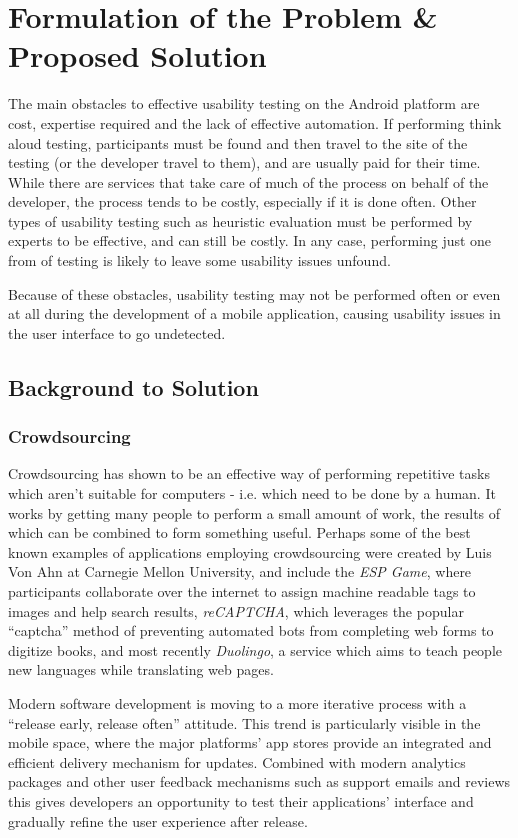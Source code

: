 \chapter{Formulation of the Problem \& Proposed Solution}

The main obstacles to effective usability testing on the Android platform are
cost, expertise required and the lack of effective automation.  If performing
think aloud testing, participants must be found and then travel to the site of
the testing (or the developer travel to them), and are usually paid for their
time. While there are services that take care of much of the process on behalf
of the developer, the process tends to be costly, especially if it is done
often.  Other types of usability testing such as heuristic evaluation must be
performed by experts to be effective, and can still be costly.  In any case,
performing just one from of testing is likely to leave some usability issues
unfound.

Because of these obstacles, usability testing may not be performed often or
even at all during the development of a mobile application, causing usability
issues in the user interface to go undetected.

\section{Background to Solution}

\subsection{Crowdsourcing}

Crowdsourcing has shown to be an effective way of performing repetitive tasks
which aren't suitable for computers - i.e. which need to be done by a human. It
works by getting many people to perform a small amount of work, the results of
which can be combined to form something useful. Perhaps some of the best known
examples of applications employing crowdsourcing were created by Luis Von Ahn
at Carnegie Mellon University, and include the \emph{ESP Game}, where
participants collaborate over the internet to assign machine readable tags to
images and help search results, \emph{reCAPTCHA}, which leverages the popular
``captcha'' method of preventing automated bots from completing web forms to
digitize books, and most recently \emph{Duolingo}, a service which aims to
teach people new languages while translating web pages.

Modern software development is moving to a more iterative process with
a ``release early, release often'' attitude. This trend is particularly visible
in the mobile space, where the major platforms' app stores provide an
integrated and efficient delivery mechanism for updates. Combined with modern
analytics packages and other user feedback mechanisms such as support emails
and reviews this gives developers an opportunity to test their applications'
interface and gradually refine the user experience after release.

